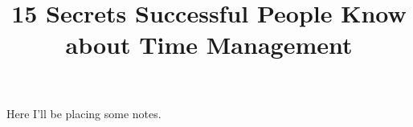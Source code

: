 \documentclass{article}
\title{15 Secrets Successful People Know about Time Management}
\begin{document}
    Here I'll be placing some notes.
\end{document}
